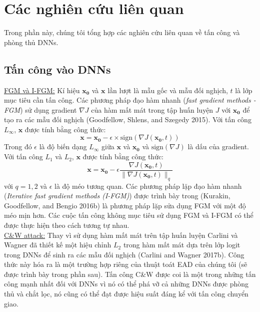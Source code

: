 \chapter{Các nghiên cứu liên quan}
Trong phần này, chúng tôi tổng hợp các nghiên cứu liên quan về tấn công và phòng thủ DNNs.

\section{Tấn công vào DNNs}
\underline{FGM và I-FGM:} Kí hiệu $\mathbf{x_0}$ và $\mathbf{x}$ lần lượt là mẫu gốc và mẫu đối nghịch,
$t$ là lớp mục tiêu cần tấn công. Các phương pháp đạo hàm nhanh (\textit{fast gradient 
methods - FGM}) sử dụng gradient $\nabla J$ của hàm mất mát trong tập huấn luyện $J$ với $\mathbf{x_0}$
để tạo ra các mẫu đối nghịch (Goodfellow, Shlens, and Szegedy 2015). Với tấn công $L_{\infty}$, 
$\mathbf{x}$ được tính bằng công thức:
\begin{equation}
    \mathbf{x} = \mathbf{x_0} - \epsilon \times \text{sign}(\nabla J(\mathbf{x_0}, t))
\end{equation}
Trong đó $\epsilon$ là độ biến dạng $L_{\infty}$ giữa $\mathbf{x}$ và $\mathbf{x_0}$ và 
$\text{sign}(\nabla J)$ là dấu của gradient. Với tấn công $L_1$ và $L_2$, $\mathbf{x}$ 
được tính bằng công thức:
\begin{equation}
    \mathbf{x} = \mathbf{x_0} - \epsilon \frac{\nabla J(\mathbf{x_0}, t)}
    {\lVert \nabla J(\mathbf{x_0}, t) \rVert _q}
\end{equation}
với $q = 1,2$ và $\epsilon$ là độ méo tương quan. Các phương pháp lặp đạo hàm nhanh 
(\textit{Iterative fast gradient methods (I-FGM)}) được trình bày trong (Kurakin, Goodfellow, 
and Bengio 2016b) là phương pháp lặp sửa dụng FGM với một độ méo mịn hơn. Các cuộc tấn công 
không mục tiêu sử dụng FGM và I-FGM có thể được thực hiện theo cách tương tự nhau. \\

\underline{C\&W attack:} Thay vì sử dụng hàm mất mát trên tập huấn luyện Carlini và Wagner
đã thiết kế  một hiệu chỉnh $L_2$ trong hàm mất mát dựa trên lớp logit trong DNNs để sinh 
ra các mẫu đối nghịch (Carlini and Wagner 2017b). Công thức này hóa ra là một trường hợp riêng của 
thuật toát EAD của chúng tôi (sẽ được trình bày trong phần sau). Tấn công C\&W được coi 
là một trong những tấn công mạnh nhất đối với DNNs vì nó có thể phá vỡ cả những DNNs được 
phòng thủ và chắt lọc, nó cũng có thể đạt được hiệu suất đáng kể với tấn công chuyển giao. \\

